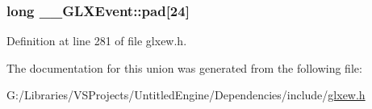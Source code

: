 \subsubsection[{pad}]{\setlength{\rightskip}{0pt plus 5cm}long \+\_\+\+\_\+\+G\+L\+X\+Event\+::pad\mbox{[}24\mbox{]}}\label{union_____g_l_x_event_a1cb8f6e7e77a34d25baf43b3f3bc2d4f}


Definition at line 281 of file glxew.\+h.



The documentation for this union was generated from the following file\+:\begin{DoxyCompactItemize}
\item 
G\+:/\+Libraries/\+V\+S\+Projects/\+Untitled\+Engine/\+Dependencies/include/\hyperlink{glxew_8h}{glxew.\+h}\end{DoxyCompactItemize}
